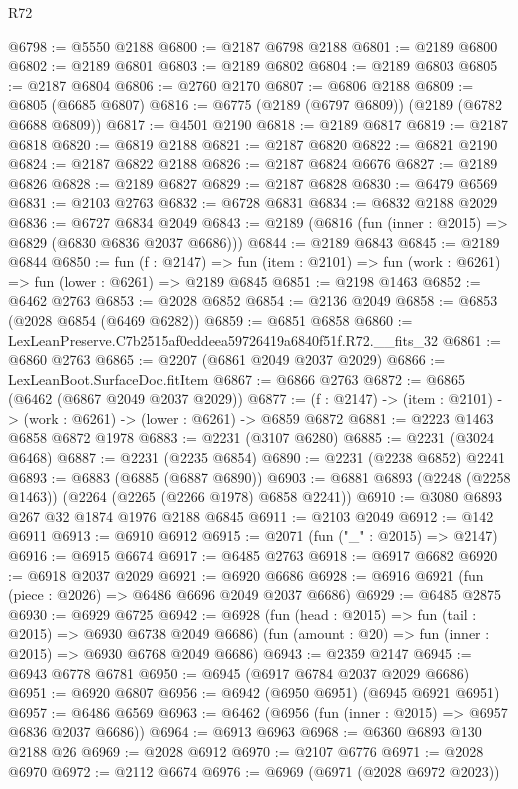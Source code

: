\begin{lexlean}{R72}
\begin{coremodule}
@6798 := @5550 @2188
@6800 := @2187 @6798 @2188
@6801 := @2189 @6800
@6802 := @2189 @6801
@6803 := @2189 @6802
@6804 := @2189 @6803
@6805 := @2187 @6804
@6806 := @2760 @2170
@6807 := @6806 @2188
@6809 := @6805 (@6685 @6807)
@6816 := @6775 (@2189 (@6797 @6809)) (@2189 (@6782 @6688 @6809))
@6817 := @4501 @2190
@6818 := @2189 @6817
@6819 := @2187 @6818
@6820 := @6819 @2188
@6821 := @2187 @6820
@6822 := @6821 @2190
@6824 := @2187 @6822 @2188
@6826 := @2187 @6824 @6676
@6827 := @2189 @6826
@6828 := @2189 @6827
@6829 := @2187 @6828
@6830 := @6479 @6569
@6831 := @2103 @2763
@6832 := @6728 @6831
@6834 := @6832 @2188 @2029
@6836 := @6727 @6834 @2049
@6843 := @2189 (@6816 (fun (inner : @2015) => @6829 (@6830 @6836 @2037 @6686)))
@6844 := @2189 @6843
@6845 := @2189 @6844
@6850 := fun (f : @2147) =>
  fun (item : @2101) => fun (work : @6261) => fun (lower : @6261) => @2189 @6845
@6851 := @2198 @1463
@6852 := @6462 @2763
@6853 := @2028 @6852
@6854 := @2136 @2049
@6858 := @6853 (@2028 @6854 (@6469 @6282))
@6859 := @6851 @6858
@6860 := LexLeanPreserve.C7b2515af0eddeea59726419a6840f51f.R72.__fits_32
@6861 := @6860 @2763
@6865 := @2207 (@6861 @2049 @2037 @2029)
@6866 := LexLeanBoot.SurfaceDoc.fitItem
@6867 := @6866 @2763
@6872 := @6865 (@6462 (@6867 @2049 @2037 @2029))
@6877 := (f : @2147) -> (item : @2101) -> (work : @6261) -> (lower : @6261) -> @6859 @6872
@6881 := @2223 @1463 @6858 @6872 @1978
@6883 := @2231 (@3107 @6280)
@6885 := @2231 (@3024 @6468)
@6887 := @2231 (@2235 @6854)
@6890 := @2231 (@2238 @6852) @2241
@6893 := @6883 (@6885 (@6887 @6890))
@6903 := @6881 @6893 (@2248 (@2258 @1463)) (@2264 (@2265 (@2266 @1978) @6858 @2241))
@6910 := @3080 @6893 @267 @32 @1874 @1976 @2188 @6845
@6911 := @2103 @2049
@6912 := @142 @6911
@6913 := @6910 @6912
@6915 := @2071 (fun ("_" : @2015) => @2147)
@6916 := @6915 @6674
@6917 := @6485 @2763
@6918 := @6917 @6682
@6920 := @6918 @2037 @2029
@6921 := @6920 @6686
@6928 := @6916 @6921 (fun (piece : @2026) => @6486 @6696 @2049 @2037 @6686)
@6929 := @6485 @2875
@6930 := @6929 @6725
@6942 := @6928
    (fun (head : @2015) => fun (tail : @2015) => @6930 @6738 @2049 @6686)
    (fun (amount : @20) => fun (inner : @2015) => @6930 @6768 @2049 @6686)
@6943 := @2359 @2147
@6945 := @6943 @6778 @6781
@6950 := @6945 (@6917 @6784 @2037 @2029 @6686)
@6951 := @6920 @6807
@6956 := @6942 (@6950 @6951) (@6945 @6921 @6951)
@6957 := @6486 @6569
@6963 := @6462 (@6956 (fun (inner : @2015) => @6957 @6836 @2037 @6686))
@6964 := @6913 @6963
@6968 := @6360 @6893 @130 @2188 @26
@6969 := @2028 @6912
@6970 := @2107 @6776
@6971 := @2028 @6970
@6972 := @2112 @6674
@6976 := @6969 (@6971 (@2028 @6972 @2023))

\end{coremodule}
\end{lexlean}
